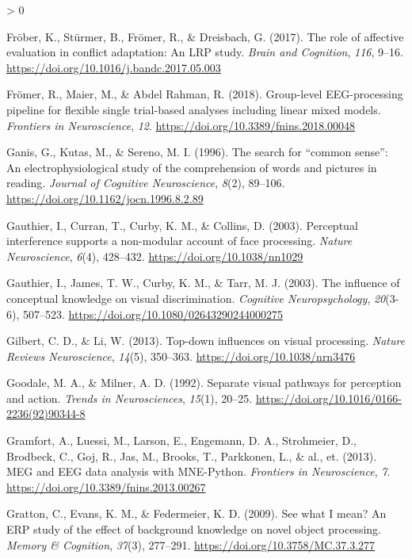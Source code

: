 \documentclass[
  english,
  doc,12pt,twoside,floatsintext]{apa7}
\newlength{\cslhangindent}
\newenvironment{CSLReferences}[2] %
 {%
  \setlength{\parindent}{0pt}
  \ifodd #1 \everypar{\setlength{\hangindent}{\cslhangindent}}\ignorespaces\fi
  \ifnum #2 > 0
  \setlength{\parskip}{#2\baselineskip}
  \fi
 }%
 {}
\begin{document}
\begin{CSLReferences}{1}{0}
\leavevmode\hypertarget{ref-fruxf6ber2017}{}%
Fröber, K., Stürmer, B., Frömer, R., \& Dreisbach, G. (2017). The role of affective evaluation in conflict adaptation: An {LRP} study. \emph{Brain and Cognition}, \emph{116}, 9--16. \url{https://doi.org/10.1016/j.bandc.2017.05.003}

\leavevmode\hypertarget{ref-fruxf6mer2018}{}%
Frömer, R., Maier, M., \& Abdel Rahman, R. (2018). Group-level {EEG}-processing pipeline for flexible single trial-based analyses including linear mixed models. \emph{Frontiers in Neuroscience}, \emph{12}. \url{https://doi.org/10.3389/fnins.2018.00048}

\leavevmode\hypertarget{ref-ganis1996}{}%
Ganis, G., Kutas, M., \& Sereno, M. I. (1996). The search for {``common sense''}: An electrophysiological study of the comprehension of words and pictures in reading. \emph{Journal of Cognitive Neuroscience}, \emph{8}(2), 89--106. \url{https://doi.org/10.1162/jocn.1996.8.2.89}

\leavevmode\hypertarget{ref-gauthier2003a}{}%
Gauthier, I., Curran, T., Curby, K. M., \& Collins, D. (2003). Perceptual interference supports a non-modular account of face processing. \emph{Nature Neuroscience}, \emph{6}(4), 428--432. \url{https://doi.org/10.1038/nn1029}

\leavevmode\hypertarget{ref-gauthier2003}{}%
Gauthier, I., James, T. W., Curby, K. M., \& Tarr, M. J. (2003). The influence of conceptual knowledge on visual discrimination. \emph{Cognitive Neuropsychology}, \emph{20}(3-6), 507--523. \url{https://doi.org/10.1080/02643290244000275}

\leavevmode\hypertarget{ref-gilbert2013}{}%
Gilbert, C. D., \& Li, W. (2013). Top-down influences on visual processing. \emph{Nature Reviews Neuroscience}, \emph{14}(5), 350--363. \url{https://doi.org/10.1038/nrn3476}

\leavevmode\hypertarget{ref-goodale1992}{}%
Goodale, M. A., \& Milner, A. D. (1992). Separate visual pathways for perception and action. \emph{Trends in Neurosciences}, \emph{15}(1), 20--25. \url{https://doi.org/10.1016/0166-2236(92)90344-8}

\leavevmode\hypertarget{ref-gramfort2013}{}%
Gramfort, A., Luessi, M., Larson, E., Engemann, D. A., Strohmeier, D., Brodbeck, C., Goj, R., Jas, M., Brooks, T., Parkkonen, L., \& al., et. (2013). MEG and {EEG} data analysis with {MNE-Python}. \emph{Frontiers in Neuroscience}, \emph{7}. \url{https://doi.org/10.3389/fnins.2013.00267}

\leavevmode\hypertarget{ref-gratton2009}{}%
Gratton, C., Evans, K. M., \& Federmeier, K. D. (2009). See what {I} mean? An {ERP} study of the effect of background knowledge on novel object processing. \emph{Memory \& Cognition}, \emph{37}(3), 277--291. \url{https://doi.org/10.3758/MC.37.3.277}


\end{CSLReferences}
\end{document}
